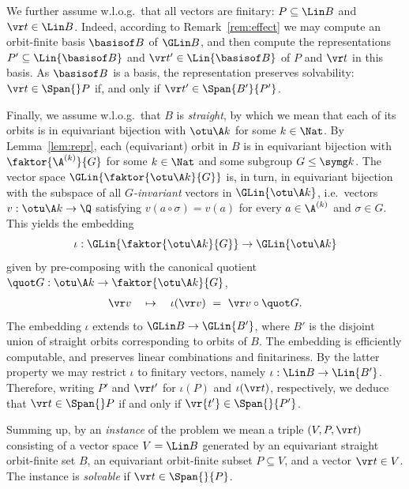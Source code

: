 We further assume w.l.o.g.~that 
all vectors are finitary: $P\subseteq \Lin B$ and $\vr t\in\Lin B$.
Indeed, 
according to Remark~\ref{rem:effect}
we may compute an orbit-finite basis $\basisof B$ of $\GLin B$, and then compute 
the representations $P'\subseteq \Lin {\basisof B}$ and $\vr t'\in\Lin{\basisof B}$ of $P$ and $\vr t$ in this basis.
As $\basisof B$ is a basis, the representation preserves solvability: $\vr t\in\Span {} P$ if, and only if $\vr t'\in\Span{B'}{P'}$.

Finally, we assume w.l.o.g.~that $B$ is \emph{straight}, by which we mean that
each of its orbits
is in equivariant bijection with  $\otu \A k$ for some $k\in\Nat$.
%
By Lemma~\ref{lem:repr}, each (equivariant) orbit in $B$ is in equivariant bijection with
$\faktor{\A^{(k)}}{G}$ for some $k \in \Nat$ and some subgroup $G\leq \symg k$.
The vector space $\GLin{\faktor{\otu \A k}{G}}$ is, in turn, in equivariant bijection 
with the subspace of all \emph{$G$-invariant} vectors in
$\GLin{\otu \A k}$, i.e.~vectors $v : \otu \A k \to \Q$
satisfying $v(a \circ \sigma) = v(a)$ for every $a\in \A^{(k)}$ and $\sigma\in G$.
This yields the embedding
\[
\iota : \GLin{\faktor{\otu \A k}{G}} \to \GLin{\otu \A k}
\]
given by pre-composing with the canonical quotient 
$\quot G : \otu \A k \to \faktor{\otu \A k}{G}$,
%
\begin{align} \label{eq:emb}
\vr v \quad \mapsto \quad \iota(\vr v) \ = \ \vr v \circ \quot G.
\end{align}
%
The embedding $\iota$ extends to $\GLin B \to \GLin{B'}$, where $B'$ is the disjoint union of straight orbits 
corresponding to orbits of $B$.
The embedding is efficiently computable, and preserves linear combinations and finitariness.
By the latter property we may restrict $\iota$ to finitary vectors, namely
$\iota : \Lin B \to \Lin {B'}$.
Therefore, writing $P'$ and $\vr t'$ for $\iota(P)$ and $\iota(\vr t)$, respectively, we deduce that
$\vr t \in \Span {} P$ if and only if $\vr {t'} \in \Span {} {P'}$.

Summing up, by an \emph{instance} of the problem we mean a triple $(V, P, \vr t)$ consisting of
a vector space $V = \Lin B$ generated by an equivariant straight orbit-finite set $B$,
an equivariant orbit-finite subset  $P \subseteq V$, and a vector $\vr t\in V$.
%
The instance is \emph{solvable} if $\vr t \in \Span {} {P}$.
%

